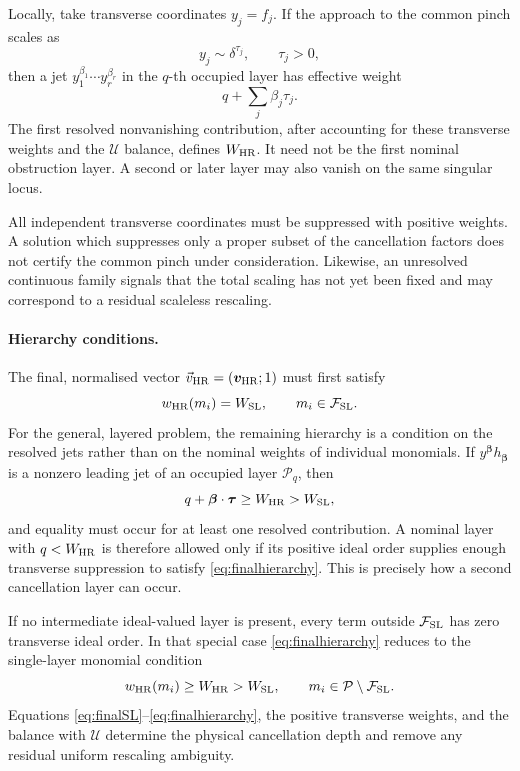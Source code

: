 \documentclass[a4paper,11pt]{article}
\newcommand{\HR}{\mathrm{HR}}
\newcommand{\FSL}{\mathcal F_{\rm SL}}
\newcommand{\WSL}{W_{\rm SL}}
\newcommand{\WHR}{W_{\rm HR}}
\newcommand{\vHR}{\vec v_{\rm HR}}
\begin{document}
Locally, take transverse coordinates \(y_j=f_j\).  If the approach to the
common pinch scales as
\begin{equation}
 y_j\sim\delta^{\tau_j},
 \qquad \tau_j>0,
\label{eq:transverseweights}
\end{equation}
then a jet \(y_1^{\beta_1}\cdots y_r^{\beta_r}\) in the \(q\)-th occupied
layer has effective weight
\begin{equation}
 q+\sum_j\beta_j\tau_j.
\label{eq:effectiveweight}
\end{equation}
The first resolved nonvanishing contribution, after accounting for these
transverse weights and the \(\mathcal U\) balance, defines \(\WHR\).  It need
not be the first nominal obstruction layer.  A second or later layer may
also vanish on the same singular locus.

All independent transverse coordinates must be suppressed with positive
weights.  A solution which suppresses only a proper subset of the
cancellation factors does not certify the common pinch under consideration.
Likewise, an unresolved continuous family signals that the total scaling has
not yet been fixed and may correspond to a residual scaleless rescaling.

\paragraph{Hierarchy conditions.}

The final, normalised vector \(\vHR=(\boldsymbol v_{\HR};1)\) must first
satisfy
\begin{equation}
 w_{\HR}(m_i)=\WSL,
 \qquad m_i\in\FSL.
\label{eq:finalSL}
\end{equation}
For the general, layered problem, the remaining hierarchy is a condition on
the resolved jets rather than on the nominal weights of individual
monomials.  If \(y^{\boldsymbol\beta}h_{\boldsymbol\beta}\) is a nonzero
leading jet of an occupied layer \(\mathcal P_q\), then
\begin{equation}
 q+\boldsymbol\beta\cdot\boldsymbol\tau
 \geq\WHR>\WSL,
\label{eq:finalhierarchy}
\end{equation}
and equality must occur for at least one resolved contribution.  A nominal
layer with \(q<\WHR\) is therefore allowed only if its positive ideal order
supplies enough transverse suppression to satisfy
\eqref{eq:finalhierarchy}.  This is precisely how a second cancellation
layer can occur.

If no intermediate ideal-valued layer is present, every term outside
\(\FSL\) has zero transverse ideal order.  In that special case
\eqref{eq:finalhierarchy} reduces to the single-layer monomial condition
\begin{equation}
 w_{\HR}(m_i)\geq\WHR>\WSL,
 \qquad m_i\in\mathcal P\setminus\FSL.
\label{eq:single-layer-hierarchy}
\end{equation}
Equations \eqref{eq:finalSL}--\eqref{eq:finalhierarchy}, the positive
transverse weights, and the balance with \(\mathcal U\) determine the
physical cancellation depth and remove any residual uniform rescaling
ambiguity.
\end{document}
